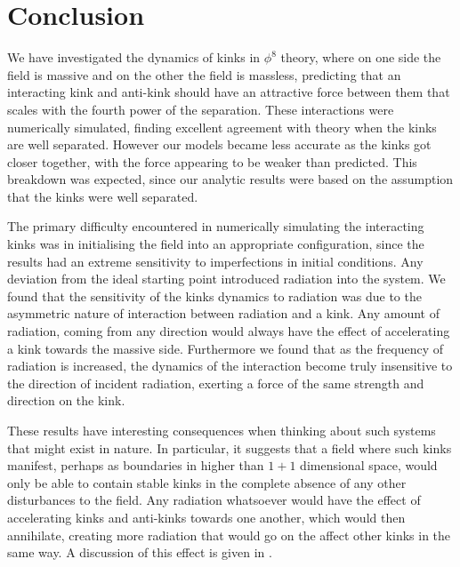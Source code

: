 \documentclass[11pt, oneside,titlepage]{article}  	%
\numberwithin{equation}{section}
\begin{document}
\section{Conclusion}
We have investigated the dynamics of kinks in $\phi^8$ theory, where on one side the field is massive and on the other the field is massless, predicting that an interacting kink and anti-kink should have an attractive force between them that scales with the fourth power of the separation. These interactions were numerically simulated, finding excellent agreement with theory when the kinks are well separated. However our models became less accurate as the kinks got closer together, with the force appearing to be weaker than predicted. This breakdown was expected, since our analytic results were based on the assumption that the kinks were well separated.\par
The primary difficulty encountered in numerically simulating the interacting kinks was in initialising the field into an appropriate configuration, since the results had an extreme sensitivity to imperfections in initial conditions. Any deviation from the ideal starting point introduced radiation into the system. We found that the sensitivity of the kinks dynamics to radiation was due to the asymmetric nature of interaction between radiation and a kink. Any amount of radiation, coming from any direction would always have the effect of accelerating a kink towards the massive side. Furthermore we found that as the frequency of radiation is increased, the dynamics of the interaction become truly insensitive to the direction of incident radiation, exerting a force of the same strength and direction on the kink.\par
These results have interesting consequences when thinking about such systems that might exist in nature. In particular, it suggests that a field where such kinks manifest, perhaps as boundaries in higher than $1 + 1$ dimensional space, would only be able to contain stable kinks in the complete absence of any other disturbances to the field. Any radiation whatsoever would have the effect of accelerating kinks and anti-kinks towards one another, which would then annihilate, creating more radiation that would go on the affect other kinks in the same way. A discussion of this effect is given in \cite{Roma_czukiewicz_2017}.\par
\end{document}
